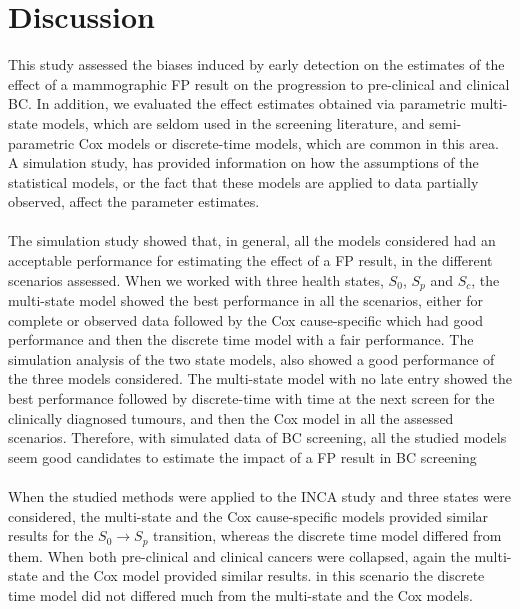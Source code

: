 \section{Discussion}
This study assessed the biases induced by early detection on the estimates of the effect of a
mammographic FP result on the progression to pre-clinical and clinical BC. In addition, we
evaluated the effect estimates obtained via parametric multi-state models, which are seldom used in
the screening literature, and semi-parametric Cox models or discrete-time models, which are common
in this area. A simulation study, has provided information on how the assumptions of the
statistical models, or the fact that these models are applied to data partially observed, affect
the parameter estimates. 

\paragraph{}The simulation study showed that, in general, all the models considered had an
acceptable performance for estimating the effect of a FP result, in the different scenarios
assessed. When we worked with three health states, $S_0$, $S_p$ and $S_c$, the multi-state model
showed the best performance in all the scenarios, either for complete or observed data followed by
the Cox cause-specific which had good performance and then the discrete time model with a fair
performance. The simulation analysis of the two state models, also showed a good performance of the
three models considered. The multi-state model with no late entry showed the best performance
followed by discrete-time with time at the next screen for the clinically diagnosed tumours, and
then the Cox model in all the assessed scenarios. Therefore, with simulated data of BC screening,
all the studied models seem good candidates to estimate the impact of a FP result in BC screening 

\paragraph{}When the studied methods were applied to the INCA study and three states were
considered, the multi-state and the Cox cause-specific models provided similar results for the
$S_0 \rightarrow S_p$ transition, whereas the discrete time model differed from them. When both
pre-clinical and clinical cancers were collapsed, again the multi-state and the Cox model provided
similar results. in this scenario the discrete time model did not differed much from the
multi-state and the Cox models.

